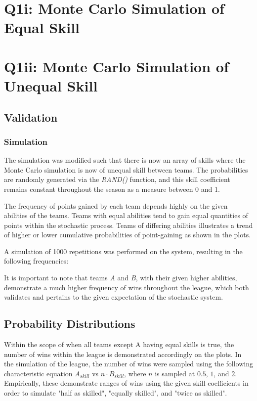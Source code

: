 \documentclass[12pt]{article}
\begin{document}
\tableofcontents
{}
\thispagestyle{empty}
\cleardoublepage
\setcounter{page}{1}
\pagebreak

\section{Q1i: Monte Carlo Simulation of Equal Skill}
\section{Q1ii: Monte Carlo Simulation of Unequal Skill}
\subsection{Validation}
\subsubsection{Simulation}
The simulation was modified such that there is now an array of skills where the Monte Carlo simulation is now of unequal skill between teams. The probabilities are randomly generated via the \emph{RAND()} function, and this skill coefficient remains constant throughout the season as a measure between 0 and 1.

The frequency of points gained by each team depends highly on the given abilities of the teams. Teams with equal abilities tend to gain equal quantities of points within the stochastic process. Teams of differing abilities illustrates a trend of higher or lower cumulative probabilities of point-gaining as shown in the plots.

A simulation of 1000 repetitions was performed on the system, resulting in the following frequencies:

It is important to note that teams \emph{A} and \emph{B}, with their given higher abilities, demonstrate a much higher frequency of wins throughout the league, which both validates and pertains to the given expectation of the stochastic system.


\subsection{Probability Distributions}
Within the scope of when all teams except A having equal skills is true, the number of wins within the league is demonstrated accordingly on the plots. In the simulation of the league, the number of wins were sampled using the following characteristic equation $A_{skill}$ vs $n \cdot B_{skill}$, where $n$ is sampled at $0.5$, $1$, and $2$. Empirically, these demonstrate ranges of wins using the given skill coefficients in order to simulate "half as skilled", "equally skilled", and "twice as skilled".
\end{document}
